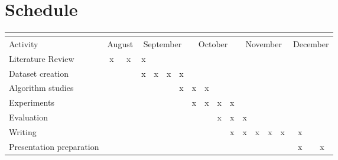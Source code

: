 \chapter{Schedule}

\begin{center}
    \begin{table}[htp]
        \begin{tabular}{l|c|c|c|c|c|c|c|c|c|c|c|c|c|c|c|c|}
        \cline{2-17}
        & \multicolumn{16}{c|}{\cellcolor[HTML]{C0C0C0}{\color[HTML]{333333} Period}} \\ \hline
        \multicolumn{1}{|l|}{\cellcolor[HTML]{C0C0C0}Activity} & \multicolumn{2}{c|}{August} & \multicolumn{4}{c|}{September} & \multicolumn{4}{c|}{October} & \multicolumn{4}{c|}{November} & \multicolumn{2}{c|}{December} \\ \hline
        \multicolumn{1}{|l|}{Literature Review}                & x            & x            & x      &       &       &       &       &       &       &      &       &       &       &       &               &               \\ \hline
        \multicolumn{1}{|l|}{Dataset creation}                 &              &              & x      & x     & x     & x     &       &       &       &      &       &       &       &       &               &               \\ \hline
        \multicolumn{1}{|l|}{Algorithm studies}                &              &              &        &       &       & x     & x     & x     &       &      &       &       &       &       &               &               \\ \hline
        \multicolumn{1}{|l|}{Experiments}                      &              &              &        &       &       &       & x     & x     & x     & x    &       &       &       &       &               &               \\ \hline
        \multicolumn{1}{|l|}{Evaluation}                       &              &              &        &       &       &       &       &       & x     & x    & x     &       &       &       &               &               \\ \hline
        \multicolumn{1}{|l|}{Writing}                          &              &              &        &       &       &       &       &       &       & x    & x     & x     & x     & x     & x             &               \\ \hline
        \multicolumn{1}{|l|}{Presentation preparation}         &              &              &        &       &       &       &       &       &       &      &       &       &       &       & x             & x             \\ \hline
        \end{tabular}
    \end{table}
\end{center}

